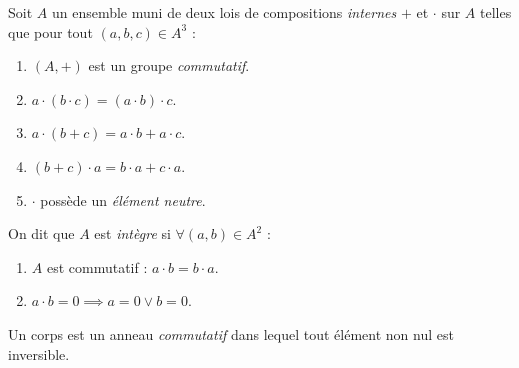 \begin{definition}[Anneau]
	Soit $A$ un ensemble muni de deux lois de compositions \emph{internes} \og $+$ \fg et \og $\cdot$ \fg sur $A$ telles que pour tout $(a, b, c) \in A^3$ : 
	\begin{multicols}{2}
		\begin{enumerate}
			\item $(A, +)$ est un groupe \emph{commutatif}.
			\item $a \cdot (b \cdot c) = (a \cdot b) \cdot c$.
			\item $a \cdot (b + c) = a \cdot b + a \cdot c$.
			\item $(b + c) \cdot a = b \cdot a + c \cdot a$.
			\item \og $\cdot$ \fg possède un \emph{élément neutre}.
		\end{enumerate}
	\end{multicols}
	\noindent On dit que $A$ est \emph{intègre} si $\forall (a, b) \in A^2$ :
	\begin{multicols}{2}
		\begin{enumerate}
			\item $A$ est commutatif : $a \cdot b = b \cdot a$.
			\item $a \cdot b = 0 \implies a = 0 \lor b = 0$.
		\end{enumerate}
	\end{multicols}
\end{definition}

\begin{definition}[Corps]
    Un corps est un anneau \emph{commutatif} dans lequel tout élément non nul est inversible.
\end{definition}


